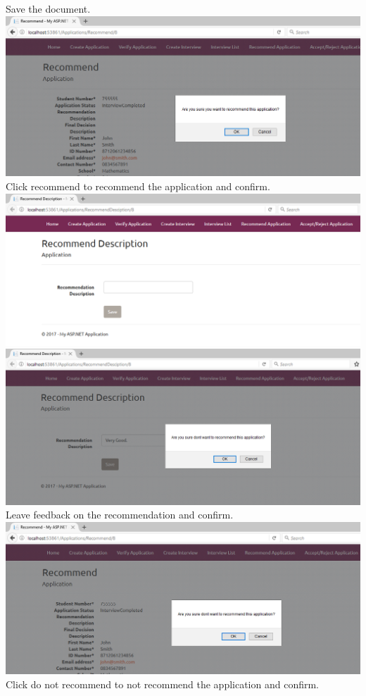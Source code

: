 \documentclass{article}
\begin{document}
\begin{center}
Save the document.\\ \bigskip
\includegraphics[scale=0.5]{RecommendApplication4.png}\\
Click recommend to recommend the application and confirm.\\ \bigskip
\includegraphics[scale=0.5]{RecommendApplication5.png}\\
\includegraphics[scale=0.5]{RecommendApplication6.png}\\
Leave feedback on the recommendation and confirm. \\ \bigskip
\includegraphics[scale=0.5]{RecommendApplicationNotRecommended.png}\\
Click do not recommend to not recommend the application and confirm.\\ \bigskip
\end{center}
\end{document}
